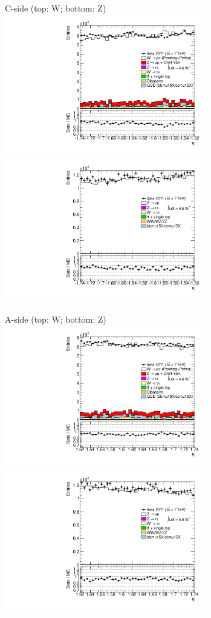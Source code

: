 {

\colb[T]

C-side (top: W; bottom: Z)
\centering
\includegraphics[width=0.66\textwidth]{dates/20130306/figures/etaphi/W_8_C_stack_l_eta_NEG} \\
\includegraphics[width=0.66\textwidth]{dates/20130306/figures/etaphi/Z_8_C_stack_lN_eta_ALL.pdf}

A-side (top: W; bottom: Z)
\centering
\includegraphics[width=0.66\textwidth]{dates/20130306/figures/etaphi/W_8_A_stack_l_eta_NEG} \\
\includegraphics[width=0.66\textwidth]{dates/20130306/figures/etaphi/Z_8_A_stack_lN_eta_ALL.pdf} 

\cole
}


